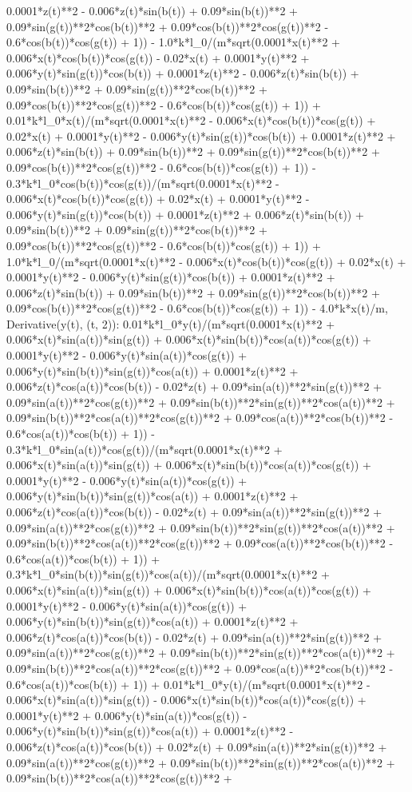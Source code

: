 0.0001*z(t)**2 - 0.006*z(t)*sin(b(t)) + 0.09*sin(b(t))**2 + 0.09*sin(g(t))**2*cos(b(t))**2 + 0.09*cos(b(t))**2*cos(g(t))**2 - 0.6*cos(b(t))*cos(g(t)) + 1)) - 1.0*k*l_0/(m*sqrt(0.0001*x(t)**2 + 0.006*x(t)*cos(b(t))*cos(g(t)) - 0.02*x(t) + 0.0001*y(t)**2 + 0.006*y(t)*sin(g(t))*cos(b(t)) + 0.0001*z(t)**2 - 0.006*z(t)*sin(b(t)) + 0.09*sin(b(t))**2 + 0.09*sin(g(t))**2*cos(b(t))**2 + 0.09*cos(b(t))**2*cos(g(t))**2 - 0.6*cos(b(t))*cos(g(t)) + 1)) + 0.01*k*l_0*x(t)/(m*sqrt(0.0001*x(t)**2 - 0.006*x(t)*cos(b(t))*cos(g(t)) + 0.02*x(t) + 0.0001*y(t)**2 - 0.006*y(t)*sin(g(t))*cos(b(t)) + 0.0001*z(t)**2 + 0.006*z(t)*sin(b(t)) + 0.09*sin(b(t))**2 + 0.09*sin(g(t))**2*cos(b(t))**2 + 0.09*cos(b(t))**2*cos(g(t))**2 - 0.6*cos(b(t))*cos(g(t)) + 1)) - 0.3*k*l_0*cos(b(t))*cos(g(t))/(m*sqrt(0.0001*x(t)**2 - 0.006*x(t)*cos(b(t))*cos(g(t)) + 0.02*x(t) + 0.0001*y(t)**2 - 0.006*y(t)*sin(g(t))*cos(b(t)) + 0.0001*z(t)**2 + 0.006*z(t)*sin(b(t)) + 0.09*sin(b(t))**2 + 0.09*sin(g(t))**2*cos(b(t))**2 + 0.09*cos(b(t))**2*cos(g(t))**2 - 0.6*cos(b(t))*cos(g(t)) + 1)) + 1.0*k*l_0/(m*sqrt(0.0001*x(t)**2 - 0.006*x(t)*cos(b(t))*cos(g(t)) + 0.02*x(t) + 0.0001*y(t)**2 - 0.006*y(t)*sin(g(t))*cos(b(t)) + 0.0001*z(t)**2 + 0.006*z(t)*sin(b(t)) + 0.09*sin(b(t))**2 + 0.09*sin(g(t))**2*cos(b(t))**2 + 0.09*cos(b(t))**2*cos(g(t))**2 - 0.6*cos(b(t))*cos(g(t)) + 1)) - 4.0*k*x(t)/m, Derivative(y(t), (t, 2)): 0.01*k*l_0*y(t)/(m*sqrt(0.0001*x(t)**2 + 0.006*x(t)*sin(a(t))*sin(g(t)) + 0.006*x(t)*sin(b(t))*cos(a(t))*cos(g(t)) + 0.0001*y(t)**2 - 0.006*y(t)*sin(a(t))*cos(g(t)) + 0.006*y(t)*sin(b(t))*sin(g(t))*cos(a(t)) + 0.0001*z(t)**2 + 0.006*z(t)*cos(a(t))*cos(b(t)) - 0.02*z(t) + 0.09*sin(a(t))**2*sin(g(t))**2 + 0.09*sin(a(t))**2*cos(g(t))**2 + 0.09*sin(b(t))**2*sin(g(t))**2*cos(a(t))**2 + 0.09*sin(b(t))**2*cos(a(t))**2*cos(g(t))**2 + 0.09*cos(a(t))**2*cos(b(t))**2 - 0.6*cos(a(t))*cos(b(t)) + 1)) - 0.3*k*l_0*sin(a(t))*cos(g(t))/(m*sqrt(0.0001*x(t)**2 + 0.006*x(t)*sin(a(t))*sin(g(t)) + 0.006*x(t)*sin(b(t))*cos(a(t))*cos(g(t)) + 0.0001*y(t)**2 - 0.006*y(t)*sin(a(t))*cos(g(t)) + 0.006*y(t)*sin(b(t))*sin(g(t))*cos(a(t)) + 0.0001*z(t)**2 + 0.006*z(t)*cos(a(t))*cos(b(t)) - 0.02*z(t) + 0.09*sin(a(t))**2*sin(g(t))**2 + 0.09*sin(a(t))**2*cos(g(t))**2 + 0.09*sin(b(t))**2*sin(g(t))**2*cos(a(t))**2 + 0.09*sin(b(t))**2*cos(a(t))**2*cos(g(t))**2 + 0.09*cos(a(t))**2*cos(b(t))**2 - 0.6*cos(a(t))*cos(b(t)) + 1)) + 0.3*k*l_0*sin(b(t))*sin(g(t))*cos(a(t))/(m*sqrt(0.0001*x(t)**2 + 0.006*x(t)*sin(a(t))*sin(g(t)) + 0.006*x(t)*sin(b(t))*cos(a(t))*cos(g(t)) + 0.0001*y(t)**2 - 0.006*y(t)*sin(a(t))*cos(g(t)) + 0.006*y(t)*sin(b(t))*sin(g(t))*cos(a(t)) + 0.0001*z(t)**2 + 0.006*z(t)*cos(a(t))*cos(b(t)) - 0.02*z(t) + 0.09*sin(a(t))**2*sin(g(t))**2 + 0.09*sin(a(t))**2*cos(g(t))**2 + 0.09*sin(b(t))**2*sin(g(t))**2*cos(a(t))**2 + 0.09*sin(b(t))**2*cos(a(t))**2*cos(g(t))**2 + 0.09*cos(a(t))**2*cos(b(t))**2 - 0.6*cos(a(t))*cos(b(t)) + 1)) + 0.01*k*l_0*y(t)/(m*sqrt(0.0001*x(t)**2 - 0.006*x(t)*sin(a(t))*sin(g(t)) - 0.006*x(t)*sin(b(t))*cos(a(t))*cos(g(t)) + 0.0001*y(t)**2 + 0.006*y(t)*sin(a(t))*cos(g(t)) - 0.006*y(t)*sin(b(t))*sin(g(t))*cos(a(t)) + 0.0001*z(t)**2 - 0.006*z(t)*cos(a(t))*cos(b(t)) + 0.02*z(t) + 0.09*sin(a(t))**2*sin(g(t))**2 + 0.09*sin(a(t))**2*cos(g(t))**2 + 0.09*sin(b(t))**2*sin(g(t))**2*cos(a(t))**2 + 0.09*sin(b(t))**2*cos(a(t))**2*cos(g(t))**2 + 